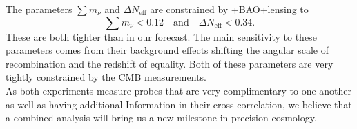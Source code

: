 \documentclass[../main.tex]{subfiles}
\begin{document}
    The parameters $\sum m_\nu$ and $\Delta N_\mathrm{eff}$ are constrained by \Planck+BAO+lensing to 
    \begin{equation}
        \sum m_\nu < 0.12 \quad \text{and}\quad \Delta N_\mathrm{eff} < 0.34.
    \end{equation}
    These are both tighter than in our \Euclid forecast. The main sensitivity to these parameters comes from their background effects shifting the angular scale of recombination and the redshift of equality. Both of these parameters are very tightly constrained by the CMB measurements.\\
    As both experiments measure probes that are very complimentary to one another as well as having additional Information in their cross-correlation, we believe that a combined analysis will bring us a new milestone in precision cosmology.
    \begin{table}[!h]
        \renewcommand{\arraystretch}{1.2}
          \centering
        \caption{Forecast 68\% confidence levels for the different \Euclid probes and the combined probe. For the parameters $\sum m_\nu$ and $\Delta \neff$ we only state the 95\% upper limit as they are bound from below by their theoretical prior. The spectroscopic probe alone was not able to constrain $w_a$ within our prior edges.}

\label{tab:results}
\end{table}
\end{document}
